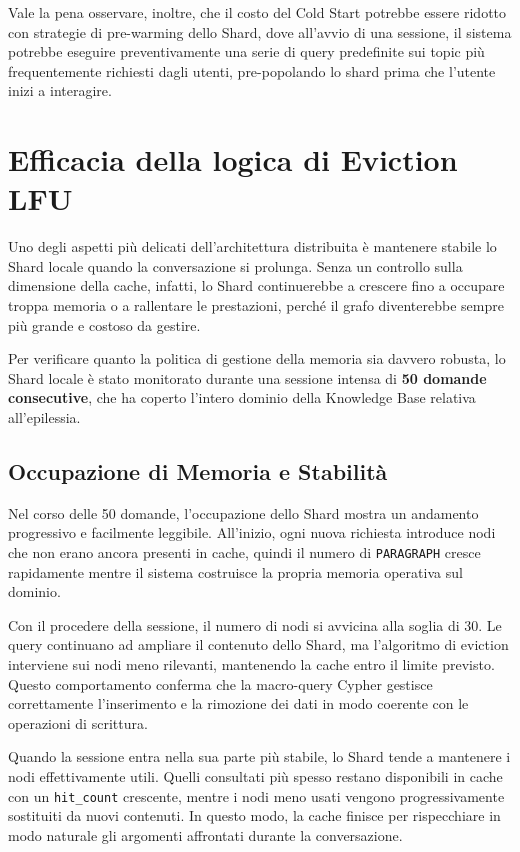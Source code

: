 Vale la pena osservare, inoltre, che il costo del Cold Start potrebbe essere ridotto con strategie di pre-warming dello Shard, dove all'avvio di una sessione, il sistema potrebbe eseguire preventivamente una serie di query predefinite sui topic più frequentemente richiesti dagli utenti, pre-popolando lo shard prima che l'utente inizi a interagire.

\section{Efficacia della logica di Eviction LFU}

Uno degli aspetti più delicati dell'architettura distribuita è mantenere stabile lo Shard locale quando la conversazione si prolunga. Senza un controllo sulla dimensione della cache, infatti, lo Shard continuerebbe a crescere fino a occupare troppa memoria o a rallentare le prestazioni, perché il grafo diventerebbe sempre più grande e costoso da gestire.

Per verificare quanto la politica di gestione della memoria sia davvero robusta, lo Shard locale è stato monitorato durante una sessione intensa di \textbf{50 domande consecutive}, che ha coperto l'intero dominio della Knowledge Base relativa all'epilessia.

\subsection{Occupazione di Memoria e Stabilità}

Nel corso delle 50 domande, l'occupazione dello Shard mostra un andamento progressivo e facilmente leggibile. All'inizio, ogni nuova richiesta introduce nodi che non erano ancora presenti in cache, quindi il numero di \texttt{PARAGRAPH} cresce rapidamente mentre il sistema costruisce la propria memoria operativa sul dominio.

Con il procedere della sessione, il numero di nodi si avvicina alla soglia di 30. Le query continuano ad ampliare il contenuto dello Shard, ma l'algoritmo di eviction interviene sui nodi meno rilevanti, mantenendo la cache entro il limite previsto. Questo comportamento conferma che la macro-query Cypher gestisce correttamente l'inserimento e la rimozione dei dati in modo coerente con le operazioni di scrittura.

Quando la sessione entra nella sua parte più stabile, lo Shard tende a mantenere i nodi effettivamente utili. Quelli consultati più spesso restano disponibili in cache con un \texttt{hit\_count} crescente, mentre i nodi meno usati vengono progressivamente sostituiti da nuovi contenuti. In questo modo, la cache finisce per rispecchiare in modo naturale gli argomenti affrontati durante la conversazione.

